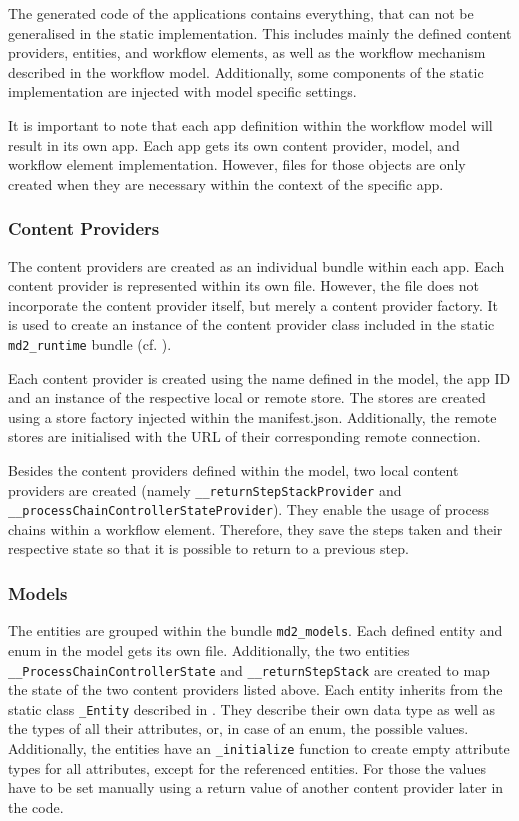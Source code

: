 The generated code of the \mapapps applications contains everything, that can not be generalised in the static implementation. This includes mainly the defined content providers, entities, and workflow elements, as well as the workflow mechanism described in the workflow model. Additionally, some components of the static \mapapps implementation are injected with model specific settings.

It is important to note that each app definition within the workflow model will result in its own app. Each app gets its own content provider, model, and workflow element implementation. However, files for those objects are only created when they are necessary within the context of the specific app.

\subsubsection{Content Providers}
The content providers are created as an individual bundle within each app. Each content provider is represented within its own file. However, the file does not incorporate the content provider itself, but merely a content provider factory. It is used to create an instance of the content provider class included in the static \lstinline|md2_runtime| bundle (cf. ).

Each content provider is created using the name defined in the model, the app ID and an instance of the respective local or remote store. The stores are created using a store factory injected within the manifest.json.
Additionally, the remote stores are initialised with the URL of their corresponding remote connection.

Besides the content providers defined within the model, two local content providers are created (namely \lstinline|__returnStepStackProvider| and \lstinline|__processChainControllerStateProvider|). They enable the usage of process chains within a workflow element. Therefore, they save the steps taken and their respective state so that it is possible to return to a previous step.

\subsubsection{Models}

The entities are grouped within the bundle \lstinline|md2_models|. Each defined entity and enum in the model gets its own file. Additionally, the two entities \lstinline|__ProcessChainControllerState| and \lstinline|__returnStepStack| are created to map the state of the two content providers listed above. Each entity inherits from the static class \lstinline|_Entity| described in . They describe their own data type as well as the types of all their attributes, or, in case of an enum, the possible values. Additionally, the entities have an \lstinline|_initialize| function to create empty attribute types for all attributes, except for the referenced entities. For those the values have to be set manually using a return value of another content provider later in the code.

